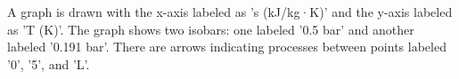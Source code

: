 A graph is drawn with the x-axis labeled as 's (kJ/kg·K)' and the y-axis labeled as 'T (K)'. The graph shows two isobars: one labeled '0.5 bar' and another labeled '0.191 bar'. There are arrows indicating processes between points labeled '0', '5', and 'L'.